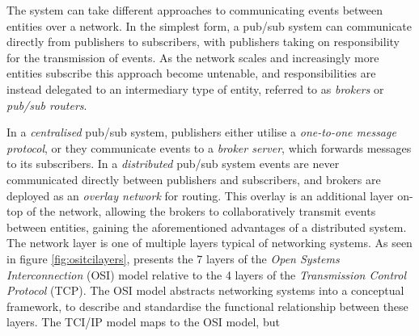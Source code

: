 \documentclass[../report.tex]{subfiles}
\begin{document}
The system can take different approaches to communicating events between entities over a network. In the simplest form, a pub/sub system can communicate directly from publishers to subscribers, with publishers taking on responsibility for the transmission of events. As the network scales and increasingly more entities subscribe this approach become untenable, and responsibilities are instead delegated to an intermediary type of entity, referred to as \textit{brokers} or \textit{pub/sub routers}.

In a \textit{centralised} pub/sub system, publishers either utilise a \textit{one-to-one message protocol}, or they communicate events to a \textit{broker server}, which forwards messages to its subscribers. In a \textit{distributed} pub/sub system events are never communicated directly between publishers and subscribers, and brokers are deployed as an \textit{overlay network} for routing. This overlay is an additional layer on-top of the network, allowing the brokers to collaboratively transmit events between entities, gaining the aforementioned advantages of a distributed system. \\

The network layer is one of multiple layers typical of networking systems. As seen in figure \ref{fig:ositcilayers}, \cite{alani2014guide} presents the 7 layers of the \textit{Open Systems Interconnection} (OSI) model relative to the 4 layers of the \textit{Transmission Control Protocol} (TCP). The OSI model abstracts networking systems into a conceptual framework, to describe and standardise the functional relationship between these layers. The TCI/IP model maps to the OSI model, but   \\

\end{document}
